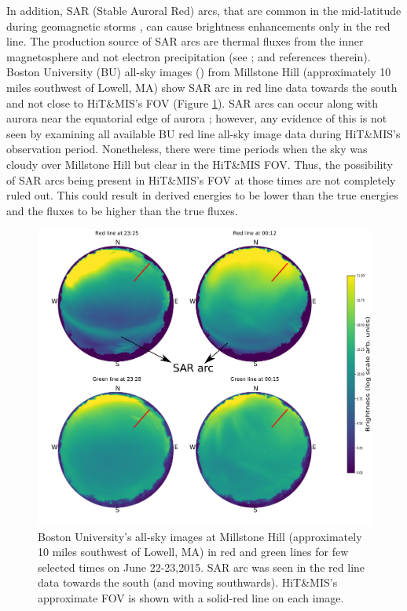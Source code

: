 \documentclass[crop=false,class=mitthesis,oneside,font=12pt]{standalone}
\begin{document}
In addition, SAR (Stable Auroral Red) arcs, that are common in the mid-latitude during geomagnetic storms \citep{mendillo_sar}, can cause brightness enhancements only in the red line. The production source of SAR arcs are thermal fluxes from the inner magnetosphere and not electron precipitation (see \cite{mendillo_sar}; \cite{kozyra_1997,rees_1975} and references therein). Boston University (BU) all-sky images (\cite{asi_1993}) from Millstone Hill (approximately 10 miles southwest of Lowell, MA) show SAR arc in red line data towards the south and not close to HiT\&MIS's FOV (Figure \ref{fig:allsky}). SAR arcs can occur along with aurora near the equatorial edge of aurora \citep{ievenko_2008}; however, any evidence of this is not seen by examining all available BU red line all-sky image data during HiT\&MIS's observation period. Nonetheless, there were time periods when the sky was cloudy over Millstone Hill but clear in the HiT\&MIS FOV. Thus, the possibility of SAR arcs being present in HiT\&MIS's FOV at those times are not completely ruled out. This could result in derived energies to be lower than the true energies and the fluxes to be higher than the true fluxes. 
\begin{figure}[H]
	\centering\includegraphics[width=35pc]{allsky.pdf}
	\caption{Boston University's all-sky images at Millstone Hill (approximately 10 miles southwest of Lowell, MA) in red and green lines for few selected times on June 22-23,2015. SAR arc was seen in the red line data towards the south (and moving southwards). HiT\&MIS's approximate FOV is shown with a solid-red line on each image.}
	\label{fig:allsky}
\end{figure}
\end{document}
